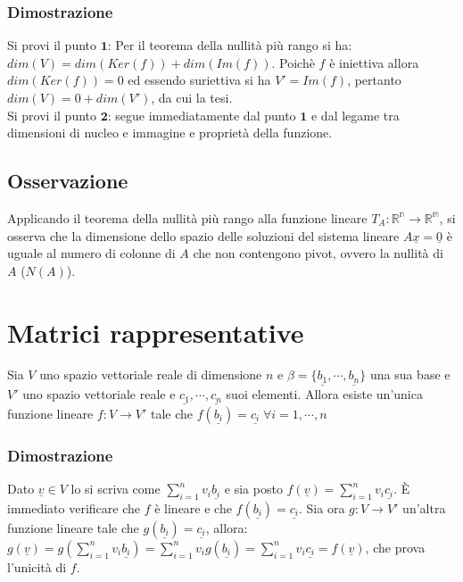 \subsubsection{Dimostrazione}
Si provi il punto $\mathbf{1}$: Per il teorema della nullit\`a pi\`u rango si ha: $dim(V)=dim(Ker(f))+dim(Im(f))$. Poich\`e $f$ \`e iniettiva allora $dim(Ker(f))=0$ ed essendo 
suriettiva si ha $V'=Im(f)$, pertanto $dim(V)=0+dim(V')$, da cui la tesi.\\
Si provi il punto $\mathbf{2}$: segue immediatamente dal punto $\mathbf{1}$ e dal legame tra dimensioni di nucleo e immagine e propriet\`a della funzione.
\subsection{Osservazione}
Applicando il teorema della nullit\`a pi\`u rango alla funzione lineare $T_A:\mathbb{R^n}\rightarrow\mathbb{R^m}$, si osserva che la dimensione dello spazio delle soluzioni del
sistema lineare $A\underline{x}=\underline{0}$ \`e uguale al numero di colonne di $A$ che non contengono pivot, ovvero la nullit\`a di $A$ ($N(A)$).
\section{Matrici rappresentative}
Sia $V$ uno spazio vettoriale reale di dimensione $n$ e $\beta=\{\underline{b_1},\cdots,\underline{b_n}\}$ una sua base e $V'$ uno spazio vettoriale reale e $\underline{c_1},\cdots, \underline{c_n}$ suoi elementi. Allora esiste un'unica funzione lineare $f:V\rightarrow V'$ tale che $f(\underline{b_i})=\underline{c_i}\;\forall i=1,\cdots,n$
\subsubsection{Dimostrazione}
Dato $\underline{v}\in V$ lo si scriva come $\sum\limits_{i=1}^nv_i\underline{b_i}$ e sia posto $f(\underline{v})=\sum\limits_{i=1}^nv_i\underline{c_i}$. \`E immediato verificare
che $f$ \`e lineare e che $f(\underline{b_i})=\underline{c_i}$. Sia ora $g:V\rightarrow V'$ un'altra funzione lineare tale che $g(\underline{b_i})=\underline{c_i}$, allora:
$g(\underline{v})=g(\sum\limits_{i=1}^nv_i\underline{b_i})=\sum\limits_{i=1}^nv_ig(\underline{b_i})=\sum\limits_{i=1}^nv_i\underline{c_i}=f(\underline{v})$, che prova l'unicit\`a 
di $f$.
